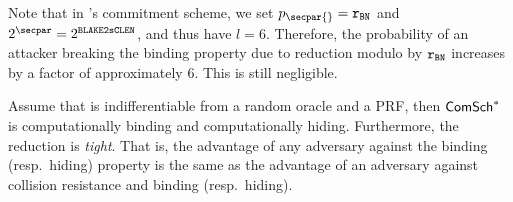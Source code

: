 \begin{remark}\label{instantiation:remark:rbn-blackcomplen}
	Note that in \zeth's commitment scheme, we set $p_\secpar{} = \rBN$ and $2^\secpar = 2^\blakeCompLen$, and thus have $l = 6$. Therefore, the probability of an attacker breaking the binding property due to reduction modulo by $\mathtt{r_{BN}}$ increases by a factor of approximately $6$. This is still negligible.
\end{remark}

\begin{cor}
    Assume that  is indifferentiable from a random oracle and a PRF, then $\mathsf{ComSch}^*$ is computationally binding and computationally hiding. Furthermore, the reduction is \emph{tight}. That is, the advantage of any \ppt{} adversary against the binding (resp.~hiding) property is the same as the advantage of an adversary against collision resistance and binding (resp.~hiding).
\end{cor}
